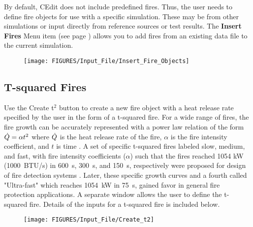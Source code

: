 By default, CEdit does not include predefined fires. Thus, the user needs to define fire objects for use with a specific simulation.  These may be from other simulations or input directly from reference sources or test results. The \textbf{Insert Fires} Menu item (see page \pageref{Fires_Menu}) allows you to add fires from an existing data file to the current simulation.

\begin{figure}[h!]
\begin{center}
\texttt{[image: FIGURES/Input\_File/Insert\_Fire\_Objects]}
\end{center}
\end{figure}

\subsection{T-squared Fires}

Use the Create t$^2$ button to create a new fire object with a heat release rate specified by the user in the form of a t-squared fire.  For a wide range of fires, the fire growth can be accurately represented with a power law relation of the form $\dot{Q}=\alpha t^2$  where $\dot{Q}$  is the heat release rate of the fire, $\alpha$ is the fire intensity coefficient, and $t$ is time \cite{Schifiliti:2002}. A set of specific t-squared fires labeled slow, medium, and fast, with fire intensity coefficients ($\alpha$) such that the fires reached 1054 kW (1000~BTU/s) in 600~s, 300~s, and 150~s, respectively were proposed for design of fire detection systems .  Later, these specific growth curves and a fourth called "Ultra-fast" which reaches 1054~kW in 75~s, gained favor in general fire protection applications. A separate window allows the user to define the t-squared fire. Details of the inputs for a t-squared fire is included below.

\begin{figure}[h!]
\begin{center}
\texttt{[image: FIGURES/Input\_File/Create\_t2]}
\end{center}
\end{figure}

